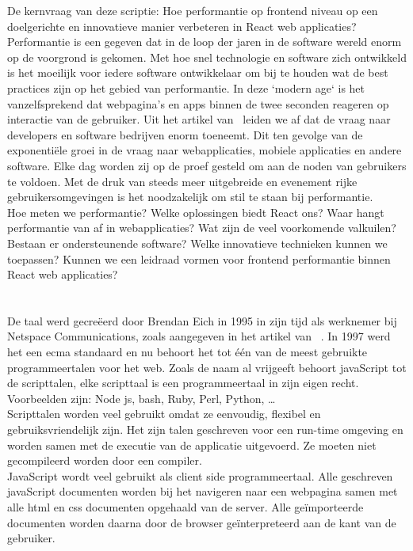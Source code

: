 De kernvraag van deze scriptie: Hoe performantie op frontend niveau op een doelgerichte en innovatieve manier verbeteren in React web applicaties?\\
Performantie is een gegeven dat in de loop der jaren in de software wereld enorm op de voorgrond is gekomen. Met hoe snel technologie en software zich ontwikkeld is het moeilijk voor iedere software ontwikkelaar om bij te houden wat de best practices zijn op het gebied van performantie. In deze `modern age` is het vanzelfsprekend dat webpagina's en apps binnen de twee seconden reageren op interactie van de gebruiker. Uit het artikel van~\textcite{Mazaika2017} leiden we af dat de vraag naar developers en software bedrijven enorm toeneemt. Dit ten gevolge van de exponentiële groei in de vraag naar webapplicaties, mobiele applicaties en andere software. Elke dag worden zij op de proef gesteld om aan de noden van gebruikers te voldoen. Met de druk van steeds meer uitgebreide en evenement rijke gebruikersomgevingen is het noodzakelijk om stil te staan bij performantie.\\
Hoe meten we performantie? Welke oplossingen biedt React ons? Waar hangt performantie van af in webapplicaties? Wat zijn de veel voorkomende valkuilen? Bestaan er ondersteunende software? Welke innovatieve technieken kunnen we toepassen? Kunnen we een leidraad vormen voor frontend performantie binnen React web applicaties?

\section{}
\label{sec:javascript}

De taal werd gecreëerd door Brendan Eich in 1995 in zijn tijd als werknemer bij Netspace Communications, zoals aangegeven in het artikel van ~\textcite{Aston2015}. In 1997 werd het een \gls{ecma} standaard en nu behoort het tot één van de meest gebruikte programmeertalen voor het web. Zoals de naam al vrijgeeft behoort javaScript tot de scripttalen, elke scripttaal is een programmeertaal in zijn eigen recht. Voorbeelden zijn: Node js, bash, Ruby, Perl, Python, \dots\\
Scripttalen worden veel gebruikt omdat ze eenvoudig, flexibel en gebruiksvriendelijk zijn. Het zijn talen geschreven voor een run-time omgeving en worden samen met de executie van de applicatie uitgevoerd. Ze moeten niet gecompileerd worden door een compiler.\\
JavaScript wordt veel gebruikt als client side programmeertaal. Alle geschreven javaScript documenten worden bij het navigeren naar een webpagina samen met alle \gls{html} en \gls{css} documenten opgehaald van de server. Alle geïmporteerde documenten worden daarna door de browser geïnterpreteerd aan de kant van de gebruiker.

